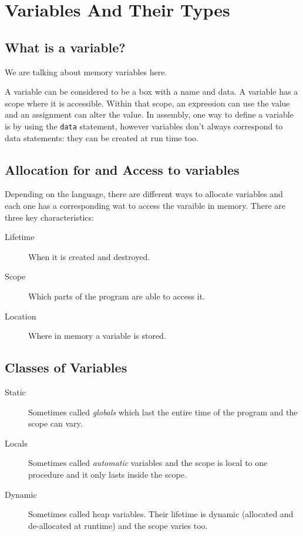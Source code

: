 \section{Variables And Their Types}\label{sec:variables_and_their_types}

\subsection{What is a variable?}\label{sub:what_is_a_variable_}

\begin{note}
    We are talking about memory variables here.
\end{note}
A variable can be considered to be a box with a name and data.
A variable has a scope where it is accessible.
Within that scope, an expression can use the value and an assignment can alter the value.
In assembly, one way to define a variable is by using the \texttt{data} statement, however variables don't always correspond to data statements: they can be created at run time too.

\subsection{Allocation for and Access to variables}\label{sub:allocation_for_and_access_to_variables}

Depending on the language, there are different ways to allocate variables and each one has a corresponding wat to access the varaible in memory.
There are three key characteristics:
\begin{description}
    \item[Lifetime] When it is created and destroyed.
    \item[Scope] Which parts of the program are able to access it.
    \item[Location] Where in memory a variable is stored.
\end{description}

\subsection{Classes of Variables}\label{sub:classes_of_variables}

\begin{description}
    \item[Static] Sometimes called \emph{globals} which last the entire time of the program and the scope can vary.
    \item[Locals] Sometimes called \emph{automatic} variables and the scope is local to one procedure and it only lasts inside the scope.
    \item[Dynamic] Sometimes called heap variables. Their lifetime is dynamic (allocated and de-allocated at runtime) and the scope varies too.
\end{description}

